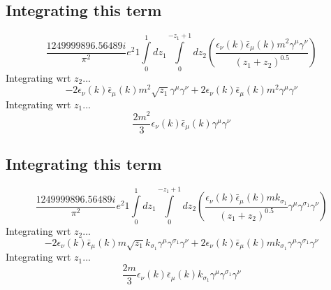 \subsection*{Integrating this term}
\begin{dmath}\frac{1249999896.56489 i}{\pi^{2}} e^{2}1\int\limits_{ 0 }^{ 1 } d{ z_{ 1 } }\int\limits_{ 0 }^{ - { z_{ 1 } } + 1 } d{ z_{ 2 } }\left(\frac{\epsilon_{ \nu }({ k }) \bar{\epsilon}_{ \mu }({ k }) m^{2} { \gamma^{ \mu } } { \gamma^{ \nu } }}{\left({ z_{ 1 } } + { z_{ 2 } }\right)^{0.5}}\right)\end{dmath}
Integrating wrt ${ z_{ 2 } }$...
\begin{dmath}- 2 \epsilon_{ \nu }({ k }) \bar{\epsilon}_{ \mu }({ k }) m^{2} \sqrt{{ z_{ 1 } }} { \gamma^{ \mu } } { \gamma^{ \nu } } + 2 \epsilon_{ \nu }({ k }) \bar{\epsilon}_{ \mu }({ k }) m^{2} { \gamma^{ \mu } } { \gamma^{ \nu } }\end{dmath}
Integrating wrt ${ z_{ 1 } }$...
\begin{dmath}\frac{2 m^{2}}{3} \epsilon_{ \nu }({ k }) \bar{\epsilon}_{ \mu }({ k }) { \gamma^{ \mu } } { \gamma^{ \nu } }\end{dmath}
\subsection*{Integrating this term}
\begin{dmath}\frac{1249999896.56489 i}{\pi^{2}} e^{2}1\int\limits_{ 0 }^{ 1 } d{ z_{ 1 } }\int\limits_{ 0 }^{ - { z_{ 1 } } + 1 } d{ z_{ 2 } }\left(\frac{\epsilon_{ \nu }({ k }) \bar{\epsilon}_{ \mu }({ k }) m { { k }_{ \sigma_1 } }}{\left({ z_{ 1 } } + { z_{ 2 } }\right)^{0.5}} { \gamma^{ \mu } } { \gamma^{ \sigma_1 } } { \gamma^{ \nu } }\right)\end{dmath}
Integrating wrt ${ z_{ 2 } }$...
\begin{dmath}- 2 \epsilon_{ \nu }({ k }) \bar{\epsilon}_{ \mu }({ k }) m \sqrt{{ z_{ 1 } }} { { k }_{ \sigma_1 } } { \gamma^{ \mu } } { \gamma^{ \sigma_1 } } { \gamma^{ \nu } } + 2 \epsilon_{ \nu }({ k }) \bar{\epsilon}_{ \mu }({ k }) m { { k }_{ \sigma_1 } } { \gamma^{ \mu } } { \gamma^{ \sigma_1 } } { \gamma^{ \nu } }\end{dmath}
Integrating wrt ${ z_{ 1 } }$...
\begin{dmath}\frac{2 m}{3} \epsilon_{ \nu }({ k }) \bar{\epsilon}_{ \mu }({ k }) { { k }_{ \sigma_1 } } { \gamma^{ \mu } } { \gamma^{ \sigma_1 } } { \gamma^{ \nu } }\end{dmath}
